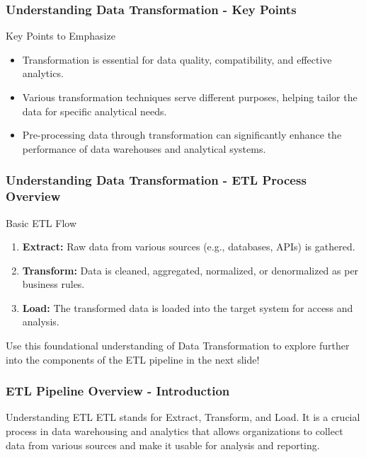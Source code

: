 \documentclass{beamer}
\begin{document}
\begin{frame}[fragile]
    \frametitle{Understanding Data Transformation - Key Points}
    
    \begin{block}{Key Points to Emphasize}
        \begin{itemize}
            \item Transformation is essential for data quality, compatibility, and effective analytics.
            \item Various transformation techniques serve different purposes, helping tailor the data for specific analytical needs.
            \item Pre-processing data through transformation can significantly enhance the performance of data warehouses and analytical systems.
        \end{itemize}
    \end{block}
\end{frame}

\begin{frame}[fragile]
    \frametitle{Understanding Data Transformation - ETL Process Overview}
    
    \begin{block}{Basic ETL Flow}
        \begin{enumerate}
            \item \textbf{Extract:} Raw data from various sources (e.g., databases, APIs) is gathered.
            \item \textbf{Transform:} Data is cleaned, aggregated, normalized, or denormalized as per business rules.
            \item \textbf{Load:} The transformed data is loaded into the target system for access and analysis.
        \end{enumerate}
    \end{block}
    
    Use this foundational understanding of Data Transformation to explore further into the components of the ETL pipeline in the next slide!
\end{frame}

\begin{frame}[fragile]
    \frametitle{ETL Pipeline Overview - Introduction}
    \begin{block}{Understanding ETL}
        ETL stands for Extract, Transform, and Load. It is a crucial process in data warehousing and analytics that allows organizations to collect data from various sources and make it usable for analysis and reporting.
    \end{block}
\end{frame}
\end{document}
